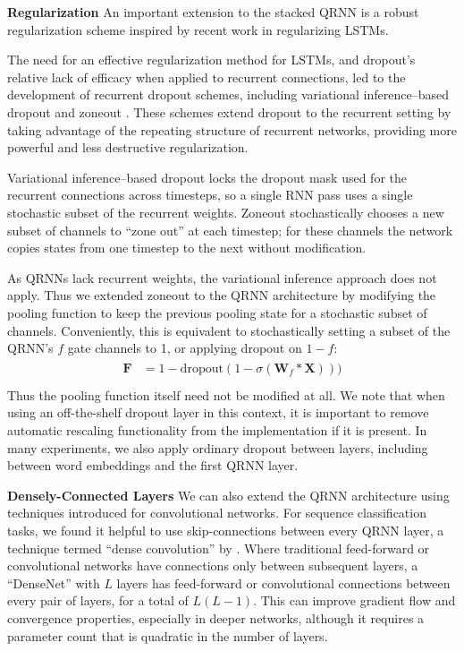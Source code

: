 \documentclass{article} %
\begin{document}
\textbf{Regularization} \label{sec:qrnn_reg}
An important extension to the stacked QRNN is a robust regularization scheme inspired by recent work in regularizing LSTMs.

The need for an effective regularization method for LSTMs, and dropout's relative lack of efficacy when applied to recurrent connections, led to the development of recurrent dropout schemes, including variational inference--based dropout \citep{Gal2015} and zoneout \citep{Krueger2016}. These schemes extend dropout to the recurrent setting by taking advantage of the repeating structure of recurrent networks, providing more powerful and less destructive regularization.

Variational inference--based dropout locks the dropout mask used for the recurrent connections across timesteps, so a single RNN pass uses a single stochastic subset of the recurrent weights.
Zoneout stochastically chooses a new subset of channels to ``zone out'' at each timestep; for these channels the network copies states from one timestep to the next without modification.

As QRNNs lack recurrent weights, the variational inference approach does not apply.  Thus we extended zoneout to the QRNN architecture by modifying the pooling function to keep the previous pooling state for a stochastic subset of channels. Conveniently, this is equivalent to stochastically setting a subset of the QRNN's $f$ gate channels to 1, or applying dropout on $1-f$:
\begin{align}
\begin{split}\label{qrnn_dropout}
\mathbf{F}&=1-\text{dropout}(1-\sigma(\mathbf{W}_f*\mathbf{X})))\\
\end{split}
\end{align}
Thus the pooling function itself need not be modified at all. We note that when using an off-the-shelf dropout layer in this context, it is important to remove automatic rescaling functionality from the implementation if it is present.
In many experiments, we also apply ordinary dropout between layers, including between word embeddings and the first QRNN layer.

\textbf{Densely-Connected Layers}
We can also extend the QRNN architecture using techniques introduced for convolutional networks. For sequence classification tasks, we found it helpful to use skip-connections between every QRNN layer, a technique termed ``dense convolution'' by \cite{Huang2016}. Where traditional feed-forward or convolutional networks have connections only between subsequent layers, a ``DenseNet'' with $L$ layers has feed-forward or convolutional connections between every pair of layers, for a total of $L(L-1)$. This can improve gradient flow and convergence properties, especially in deeper networks, although it requires a parameter count that is quadratic in the number of layers.
\end{document}
